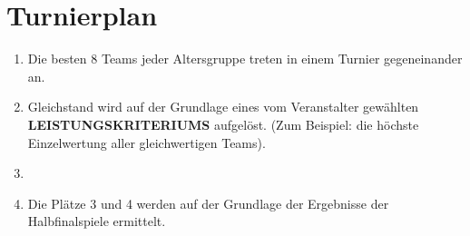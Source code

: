\documentclass[a4paper,12pt]{article}
\begin{document}
\section{Turnierplan}
\begin{enumerate}
	\item Die besten 8 Teams jeder Altersgruppe treten in einem Turnier
		gegeneinander an.
	\item Gleichstand wird auf der Grundlage eines vom Veranstalter
		gewählten \textbf{LEISTUNGSKRITERIUMS} aufgelöst. (Zum Beispiel:
		die höchste Einzelwertung aller gleichwertigen Teams).
        \item \tournamentQualification
	\item Die Plätze 3 und 4 werden auf der Grundlage der Ergebnisse der
		Halbfinalspiele ermittelt.
\end{enumerate}
\tournamentScoring
\combinedTournament
\end{document}
